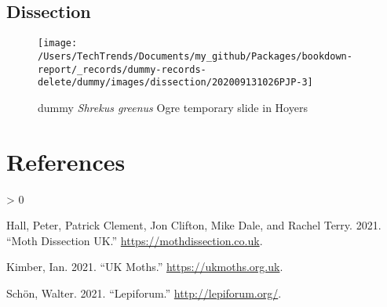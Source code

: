 \documentclass{article}
\newlength{\cslhangindent}
\newenvironment{CSLReferences}[2] %
 {%
  \setlength{\parindent}{0pt}
  \ifodd #1 \everypar{\setlength{\hangindent}{\cslhangindent}}\ignorespaces\fi
  \ifnum #2 > 0
  \setlength{\parskip}{#2\baselineskip}
  \fi
 }%
 {}
\begin{document}
\hypertarget{dissection}{%
\subsection{Dissection}\label{dissection}}

\begin{figure}[p]

{\centering \texttt{[image: /Users/TechTrends/Documents/my\_github/Packages/bookdown-report/\_records/dummy-records-delete/dummy/images/dissection/202009131026PJP-3]} 

}

\caption{dummy  \emph{ Shrekus greenus } Ogre temporary slide in Hoyers}\label{fig:unnamed-chunk-17}
\end{figure}

\hypertarget{references}{%
\section*{References}\label{references}}

\hypertarget{refs}{}
\begin{CSLReferences}{1}{0}
\leavevmode\hypertarget{ref-Hall2021}{}%
Hall, Peter, Patrick Clement, Jon Clifton, Mike Dale, and Rachel Terry. 2021. {``{Moth Dissection UK}.''} \url{https://mothdissection.co.uk}.

\leavevmode\hypertarget{ref-Kimber2021}{}%
Kimber, Ian. 2021. {``{UK Moths}.''} \url{https://ukmoths.org.uk}.

\leavevmode\hypertarget{ref-Schon2021}{}%
Schön, Walter. 2021. {``{Lepiforum}.''} \url{http://lepiforum.org/}.

\end{CSLReferences}

\let\cleardoublepage\clearpage



\end{document}
